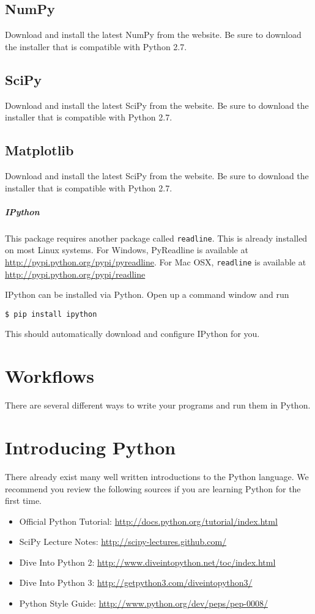 \subsection*{NumPy}
Download and install the latest NumPy from the website.  Be sure to download the installer that is compatible with Python 2.7.

\subsection*{SciPy}
Download and install the latest SciPy from the website.  Be sure to download the installer that is compatible with Python 2.7.

\subsection*{Matplotlib}
Download and install the latest SciPy from the website.  Be sure to download the installer that is compatible with Python 2.7.

\subparagraph*{IPython}
This package requires another package called \texttt{readline}.  This is already installed on most Linux systems.  For Windows, PyReadline is available at \url{http://pypi.python.org/pypi/pyreadline}.  For Mac OSX, \texttt{readline} is available at \url{http://pypi.python.org/pypi/readline}

IPython can be installed via Python.  Open up a command window and run
\begin{lstlisting}
$ pip install ipython
\end{lstlisting}

This should automatically download and configure IPython for you.

\section*{Workflows}
There are several different ways to write your programs and run them in Python.

\section*{Introducing Python}
There already exist many well written introductions to the Python language.  We recommend you review the following sources if you are learning Python for the first time.

\begin{itemize}
\item Official Python Tutorial: \url{http://docs.python.org/tutorial/index.html}
\item SciPy Lecture Notes: \url{http://scipy-lectures.github.com/}
\item Dive Into Python 2: \url{http://www.diveintopython.net/toc/index.html}
\item Dive Into Python 3: \url{http://getpython3.com/diveintopython3/}
\item Python Style Guide: \url{http://www.python.org/dev/peps/pep-0008/}
\end{itemize}

